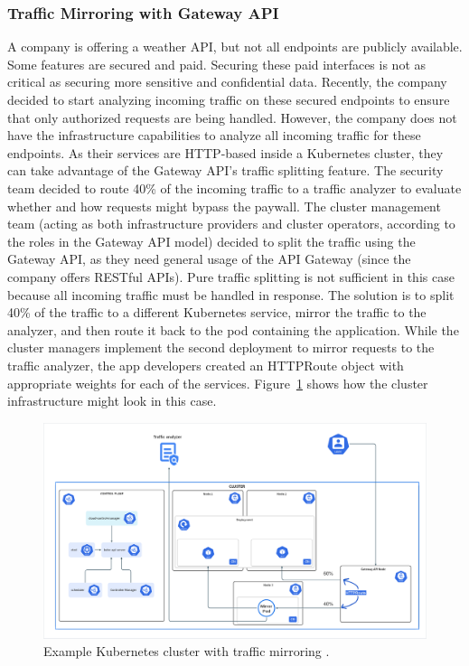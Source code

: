 
\subsubsection{Traffic Mirroring with Gateway API}
\label{subsubsection:mirroring}

A company is offering a weather API, but not all endpoints are publicly available. Some features are secured and paid. Securing these paid interfaces is not as critical as securing more sensitive and confidential data. Recently, the company decided to start analyzing incoming traffic on these secured endpoints to ensure that only authorized requests are being handled. However, the company does not have the infrastructure capabilities to analyze all incoming traffic for these endpoints. As their services are HTTP-based inside a Kubernetes cluster, they can take advantage of the Gateway API’s traffic splitting feature. The security team decided to route 40\% of the incoming traffic to a traffic analyzer to evaluate whether and how requests might bypass the paywall. The cluster management team (acting as both infrastructure providers and cluster operators, according to the roles in the Gateway API model) decided to split the traffic using the Gateway API, as they need general usage of the API Gateway (since the company offers RESTful APIs). Pure traffic splitting is not sufficient in this case because all incoming traffic must be handled in response. The solution is to split 40\% of the traffic to a different Kubernetes service, mirror the traffic to the analyzer, and then route it back to the pod containing the application. While the cluster managers implement the second deployment to mirror requests to the traffic analyzer, the app developers created an HTTPRoute object with appropriate weights for each of the services. Figure~\ref{fig:mirroringImg} shows how the cluster infrastructure might look in this case.


\begin{figure}[H]
    \centering
    \includegraphics[width=1\columnwidth]{images/ingress.png}
    \caption{Example Kubernetes cluster with traffic mirroring \cite{KubernetesDocs}.}
    \label{fig:mirroringImg}
\end{figure}

